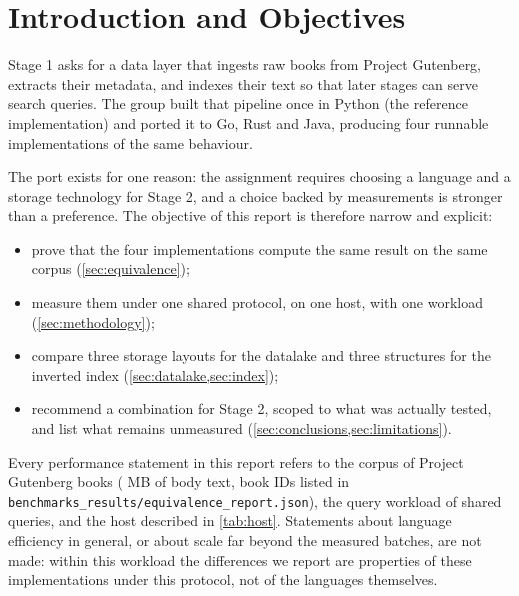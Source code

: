 \section{Introduction and Objectives}
\label{sec:introduction}

Stage 1 asks for a data layer that ingests raw books from Project Gutenberg,
extracts their metadata, and indexes their text so that later stages can serve
search queries. The group built that pipeline once in Python (the reference
implementation) and ported it to Go, Rust and Java, producing four runnable
implementations of the same behaviour.

The port exists for one reason: the assignment requires choosing a language
and a storage technology for Stage 2, and a choice backed by measurements is
stronger than a preference. The objective of this report is therefore narrow
and explicit:

\begin{itemize}
    \item prove that the four implementations compute the same result on the
    same corpus (\cref{sec:equivalence});
    \item measure them under one shared protocol, on one host, with one
    workload (\cref{sec:methodology});
    \item compare three storage layouts for the datalake and three structures
    for the inverted index (\cref{sec:datalake,sec:index});
    \item recommend a combination for Stage 2, scoped to what was actually
    tested, and list what remains unmeasured (\cref{sec:conclusions,sec:limitations}).
\end{itemize}

Every performance statement in this report refers to the corpus of
 Project Gutenberg books ( MB of body text, book
IDs listed in \texttt{benchmarks\_\allowbreak results/\allowbreak equivalence\_\allowbreak report.json}), the
query workload of  shared queries, and the host described in
\cref{tab:host}. Statements about language efficiency in general, or about
scale far beyond the measured batches, are not made: within this workload the
differences we report are properties of these implementations under this
protocol, not of the languages themselves.
